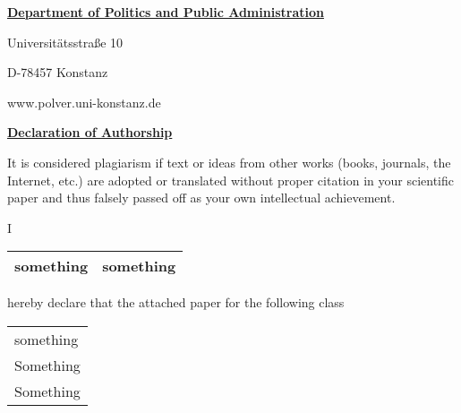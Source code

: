 {
\small
{}
\setlength{\parindent}{0cm}
\myhelvetica

\thispagestyle{page1}

{
    \raggedleft
    \small

    \textbf{\ul{Department of Politics and Public Administration}}

    \scriptsize
    \vspace{0.4cm}

    Universitätsstraße 10

    D-78457 Konstanz

    \vspace{0.2cm}

    www.polver.uni-konstanz.de

}

\vspace{0.25cm}

{\large{\textbf{\ul{Declaration of Authorship}}}}

\raggedright
\vspace{0.5cm}

It is considered plagiarism if text or ideas from other works (books, journals, the Internet, etc.) are adopted or translated without proper citation in your scientific paper and thus falsely passed off as your own intellectual achievement.

\vspace{0.5cm}

\begin{minipage}{0.05\textwidth}
    I
\end{minipage}\begin{minipage}{0.95\textwidth}
        \begin{tabularx}{\textwidth}{X|X|}
            \hline
        something & something\\
        \hline
        \end{tabularx}

\end{minipage}

\vspace{0.2cm}

hereby declare that the attached paper for the following class

\vspace{-0.25cm}

\begin{center}
\begin{tabularx}{0.975\textwidth}{|X|}
    \hline
    something\\
    Something\\
    Something\\
    \hline
\end{tabularx}
\end{center}


}
